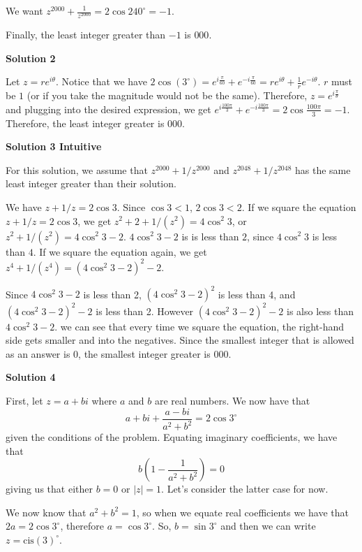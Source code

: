 \begin{enumerate}
 We want $z^{2000}+\frac 1{z^{2000}} = 2\cos 240^\circ = -1$.

 Finally, the least integer greater than $-1$ is $\boxed{000}$.

 



\textbf{Solution 2}

Let $z=re^{i\theta}$. Notice that we have $2\cos(3^{\circ})=e^{i\frac{\pi}{60}}+e^{-i\frac{\pi}{60}}=re^{i\theta}+\frac{1}{r}e^{-i\theta}.$
$r$ must be $1$ (or if you take the magnitude would not be the same). Therefore, $z=e^{i\frac{\pi}{\theta}}$ and plugging into the desired expression, we get $e^{i\frac{100\pi}{3}}+e^{-i\frac{100\pi}{3}}=2\cos{\frac{100\pi}{3}}=-1$. Therefore, the least integer greater is $\boxed{000}.$




\textbf{Solution 3 Intuitive}

For this solution, we assume that $z^{2000} + 1/z^{2000}$ and $z^{2048} + 1/z^{2048}$ has the same least integer greater than their solution.

 We have $z + 1/z = 2\cos 3$. Since $\cos 3<1$, $2\cos 3<2$. If we square the equation $z + 1/z = 2\cos 3$, we get $z^2 + 2 + 1/(z^2) = 4\cos^2 3$, or $z^2 + 1/(z^2) = 4\cos^2 3 - 2$. $4\cos^2 3 - 2$ is is less than $2$, since $4\cos^2 3$ is less than $4$. If we square the equation again, we get $z^4 + 1/(z^4) = (4\cos^2 3 - 2)^2 -2$.

 Since $4\cos^2 3 - 2$ is less than 2, $(4\cos^2 3 - 2)^2$ is less than 4, and $(4\cos^2 3 - 2)^2 -2$ is less than 2. However $(4\cos^2 3 - 2)^2 -2$ is also less than $4\cos^2 3 - 2$. we can see that every time we square the equation, the right-hand side gets smaller and into the negatives. Since the smallest integer that is allowed as an answer is 0, the smallest integer greater is $\boxed{000}.$




\textbf{Solution 4}

First, let $z = a+bi$ where $a$ and $b$ are real numbers. We now have that 
 \[a+bi+\frac{a-bi}{a^2+b^2} = 2 \cos{3^{\circ}}\] given the conditions of the problem. Equating imaginary coefficients, we have that 
 \[b \left( 1 - \frac{1}{a^2+b^2}\right) = 0\] giving us that either $b=0$ or $|z| = 1$. Let's consider the latter case for now. 

 We now know that $a^2+b^2=1$, so when we equate real coefficients we have that $2a = 2 \cos{3^{\circ}}$, therefore $a = \cos{3^{\circ}}$. So, $b = \sin{3^{\circ}}$ and then we can write $z = \text{cis}(3)^{\circ}$.


\end{enumerate}
